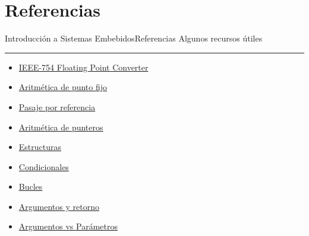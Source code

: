 \documentclass[aspectratio=169, xcolor=dvipsnames]{beamer}
\begin{document}
\section{Referencias}
\begin{frame}{Introducción a Sistemas Embebidos}{Referencias}
    Algunos recursos útiles
    \noindent\rule{\textwidth}{0.75pt}
    \begin{multicols}{2}
    \begin{itemize}
        \item \href{https://www.h-schmidt.net/FloatConverter/IEEE754.html}{IEEE-754 Floating Point Converter}
        \item \href{https://vanhunteradams.com/FixedPoint/FixedPoint.html}{Aritmética de punto fijo}
        \item \href{https://www.geeksforgeeks.org/pass-by-reference-in-c/}{Pasaje por referencia}
        \item \href{https://www.geeksforgeeks.org/pointer-arithmetics-in-c-with-examples/}{Aritmética de punteros}
        \item \href{https://www.geeksforgeeks.org/structures-c/}{Estructuras}
        \item \href{https://unstop.com/blog/conditional-if-else-statements-in-c}{Condicionales}
        \item \href{https://www.geeksforgeeks.org/c-loops/}{Bucles}
        \item \href{https://www.geeksforgeeks.org/c-function-argument-return-values/}{Argumentos y retorno}
        \item \href{https://www.shiksha.com/online-courses/articles/difference-between-argument-and-parameter-blogId-147937}{Argumentos vs Parámetros}
    \end{itemize}
    \end{multicols}
\end{frame}
\end{document}
